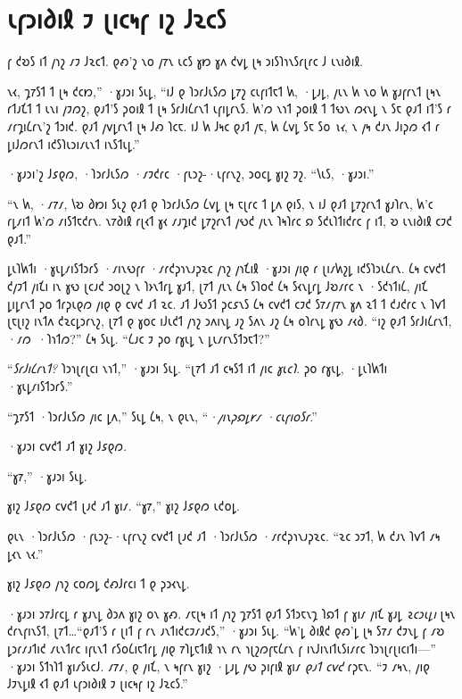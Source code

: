 \chapter{𐑧𐑝𐑮𐑦𐑔𐑦𐑙 𐑲 𐑚𐑦𐑤𐑰𐑝 𐑦𐑟 𐑓𐑷𐑤𐑕}

\begin{chapterOpeningQuote}
𐑝 𐑒𐑹𐑕 𐑦𐑑 𐑢𐑪𐑟 𐑥𐑲 𐑓𐑷𐑤𐑑. 𐑞𐑺'𐑟 𐑯𐑴 𐑢𐑳𐑯 𐑧𐑤𐑕 𐑣𐑽 𐑣𐑵 𐑒𐑫𐑛 𐑚𐑰 𐑮𐑦𐑕𐑐𐑪𐑯𐑕𐑩𐑚𐑩𐑤 𐑓 𐑧𐑯𐑦𐑔𐑦𐑙.
\end{chapterOpeningQuote}

\lettrine[ante=“]{𐑯}{𐑬}, 𐑡𐑳𐑕𐑑 𐑑 𐑚𐑰 𐑒𐑤𐑽,” ·𐑣𐑨𐑮𐑦 𐑕𐑧𐑛, “𐑦𐑓 𐑞 𐑐𐑮𐑩𐑓𐑧𐑕𐑼 𐑛𐑳𐑟 𐑤𐑧𐑝𐑦𐑑𐑱𐑑 𐑿, ·𐑛𐑨𐑛, 𐑢𐑧𐑯 𐑿 𐑯𐑴 𐑿 𐑣𐑨𐑝𐑩𐑯𐑑 𐑚𐑰𐑯 𐑩𐑑𐑨𐑗𐑑 𐑑 𐑧𐑯𐑦 𐑢𐑲𐑼𐑟, 𐑞𐑨𐑑'𐑕 𐑜𐑴𐑦𐑙 𐑑 𐑚𐑰 𐑕𐑩𐑓𐑦𐑖𐑩𐑯𐑑 𐑧𐑝𐑦𐑛𐑩𐑯𐑕. 𐑿'𐑼 𐑯𐑪𐑑 𐑜𐑴𐑦𐑙 𐑑 𐑑𐑻𐑯 𐑼𐑬𐑯𐑛 𐑯 𐑕𐑱 𐑞𐑨𐑑 𐑦𐑑'𐑕 𐑩 𐑥𐑩𐑡𐑦𐑖𐑩𐑯'𐑟 𐑑𐑮𐑦𐑒. 𐑞𐑨𐑑 𐑢𐑫𐑛𐑩𐑯𐑑 𐑚𐑰 𐑓𐑺 𐑐𐑤𐑱. 𐑦𐑓 𐑿 𐑓𐑰𐑤 𐑞𐑨𐑑 𐑢𐑱, 𐑿 𐑖𐑫𐑛 𐑕𐑱 𐑕𐑴 \emph{𐑯𐑬}, 𐑯 𐑢𐑰 𐑒𐑨𐑯 𐑓𐑦𐑜𐑼 𐑬𐑑 𐑩 𐑛𐑦𐑓𐑼𐑩𐑯𐑑 𐑦𐑒𐑕𐑐𐑧𐑮𐑦𐑥𐑧𐑯𐑑 𐑦𐑯𐑕𐑑𐑧𐑛.”

·𐑣𐑨𐑮𐑦'𐑟 𐑓𐑭𐑞𐑼, ·𐑐𐑮𐑩𐑓𐑧𐑕𐑼 ·𐑥𐑲𐑒𐑩𐑤 ·𐑝𐑧𐑮𐑟-·𐑧𐑝𐑩𐑯𐑟, 𐑮𐑴𐑤𐑛 𐑣𐑦𐑟 𐑲𐑟. “𐑘𐑧𐑕, ·𐑣𐑨𐑮𐑦.”

“𐑯 𐑿, ·𐑥𐑳𐑥, 𐑘𐑹 𐑔𐑽𐑦 𐑕𐑧𐑟 𐑞𐑨𐑑 𐑞 𐑐𐑮𐑩𐑓𐑧𐑕𐑼 𐑖𐑫𐑛 𐑚𐑰 𐑱𐑚𐑩𐑤 𐑑 𐑛𐑵 𐑞𐑦𐑕, 𐑯 𐑦𐑓 𐑞𐑨𐑑 𐑛𐑳𐑟𐑩𐑯𐑑 𐑣𐑨𐑐𐑩𐑯, 𐑿'𐑤 𐑩𐑛𐑥𐑦𐑑 𐑿'𐑼 𐑥𐑦𐑕𐑑𐑱𐑒𐑩𐑯. 𐑯𐑳𐑔𐑦𐑙 𐑩𐑚𐑬𐑑 𐑣𐑬 𐑥𐑨𐑡𐑦𐑒 𐑛𐑳𐑟𐑩𐑯𐑑 𐑢𐑻𐑒 𐑢𐑧𐑯 𐑐𐑰𐑐𐑩𐑤 𐑸 𐑕𐑒𐑧𐑐𐑑𐑦𐑒𐑩𐑤 𐑝 𐑦𐑑, 𐑹 𐑧𐑯𐑦𐑔𐑦𐑙 𐑤𐑲𐑒 𐑞𐑨𐑑.”

𐑛𐑧𐑐𐑿𐑑𐑦 ·𐑣𐑧𐑛𐑥𐑦𐑕𐑑𐑮𐑩𐑕 ·𐑥𐑦𐑯𐑻𐑝𐑩 ·𐑥𐑩𐑒𐑜𐑪𐑯𐑨𐑜𐑷𐑤 𐑢𐑪𐑟 𐑢𐑪𐑗𐑦𐑙 ·𐑣𐑨𐑮𐑦 𐑢𐑦𐑞 𐑩 𐑚𐑦𐑥𐑿𐑟𐑛 𐑦𐑒𐑕𐑐𐑮𐑧𐑖𐑩𐑯. 𐑖𐑰 𐑤𐑫𐑒𐑑 𐑒𐑢𐑲𐑑 𐑢𐑦𐑗𐑦 𐑦𐑯 𐑣𐑻 𐑚𐑤𐑨𐑒 𐑮𐑴𐑚𐑟 𐑯 𐑐𐑶𐑯𐑑𐑩𐑛 𐑣𐑨𐑑, 𐑚𐑳𐑑 𐑢𐑧𐑯 𐑖𐑰 𐑕𐑐𐑴𐑒 𐑖𐑰 𐑕𐑬𐑯𐑛𐑩𐑛 𐑓𐑹𐑥𐑩𐑤 𐑯 ·𐑕𐑒𐑪𐑑𐑦𐑖, 𐑢𐑦𐑗 𐑛𐑦𐑛𐑩𐑯𐑑 𐑜𐑴 𐑑𐑩𐑜𐑧𐑞𐑼 𐑢𐑦𐑞 𐑞 𐑤𐑫𐑒 𐑨𐑑 𐑷𐑤. 𐑨𐑑 𐑓𐑻𐑕𐑑 𐑜𐑤𐑭𐑯𐑕 𐑖𐑰 𐑤𐑫𐑒𐑑 𐑤𐑲𐑒 𐑕𐑳𐑥𐑢𐑳𐑯 𐑣𐑵 𐑷𐑑 𐑑 𐑒𐑨𐑒𐑩𐑤 𐑯 𐑐𐑫𐑑 𐑚𐑱𐑚𐑦𐑟 𐑦𐑯𐑑𐑵 𐑒𐑷𐑤𐑛𐑮𐑩𐑯𐑟, 𐑚𐑳𐑑 𐑞 𐑣𐑴𐑤 𐑦𐑓𐑧𐑒𐑑 𐑢𐑪𐑟 𐑮𐑵𐑦𐑯𐑛 𐑨𐑟 𐑕𐑵𐑯 𐑨𐑟 𐑖𐑰 𐑴𐑐𐑩𐑯𐑛 𐑣𐑻 𐑥𐑬𐑔. “𐑦𐑟 𐑞𐑨𐑑 𐑕𐑩𐑓𐑦𐑖𐑩𐑯𐑑, ·𐑥𐑼~·𐑐𐑪𐑑𐑼?” 𐑖𐑰 𐑕𐑧𐑛. “𐑖𐑨𐑤 𐑲 𐑜𐑴 𐑩𐑣𐑧𐑛 𐑯 𐑛𐑧𐑥𐑩𐑯𐑕𐑑𐑮𐑱𐑑?”

“\emph{𐑕𐑩𐑓𐑦𐑖𐑩𐑯𐑑?} 𐑐𐑮𐑪𐑚𐑩𐑚𐑤𐑦 𐑯𐑪𐑑,” ·𐑣𐑨𐑮𐑦 𐑕𐑧𐑛. “𐑚𐑳𐑑 𐑨𐑑 𐑤𐑰𐑕𐑑 𐑦𐑑 𐑢𐑦𐑤 \emph{𐑣𐑧𐑤𐑐}. 𐑜𐑴 𐑩𐑣𐑧𐑛, ·𐑛𐑧𐑐𐑿𐑑𐑦 ·𐑣𐑧𐑛𐑥𐑦𐑕𐑑𐑮𐑩𐑕.”

“𐑡𐑳𐑕𐑑 ·𐑐𐑮𐑩𐑓𐑧𐑕𐑼 𐑢𐑦𐑤 𐑛𐑵,” 𐑕𐑧𐑛 𐑖𐑰, 𐑯 𐑞𐑧𐑯, “\emph{·𐑢𐑦𐑯𐑜𐑸𐑛𐑾𐑥 ·𐑤𐑧𐑝𐑦𐑴𐑕𐑩}.”

·𐑣𐑨𐑮𐑦 𐑤𐑫𐑒𐑑 𐑨𐑑 𐑣𐑦𐑟 𐑓𐑭𐑞𐑼.

“𐑣𐑳,” ·𐑣𐑨𐑮𐑦 𐑕𐑧𐑛.

𐑣𐑦𐑟 𐑓𐑭𐑞𐑼 𐑤𐑫𐑒𐑑 𐑚𐑨𐑒 𐑨𐑑 𐑣𐑦𐑥. “𐑣𐑳,” 𐑣𐑦𐑟 𐑓𐑭𐑞𐑼 𐑧𐑒𐑴𐑛.

𐑞𐑧𐑯 ·𐑐𐑮𐑩𐑓𐑧𐑕𐑼 ·𐑝𐑧𐑮𐑟-·𐑧𐑝𐑩𐑯𐑟 𐑤𐑫𐑒𐑑 𐑚𐑨𐑒 𐑨𐑑 ·𐑐𐑮𐑩𐑓𐑧𐑕𐑼 ·𐑥𐑩𐑒𐑜𐑪𐑯𐑨𐑜𐑷𐑤. “𐑷𐑤 𐑮𐑲𐑑, 𐑿 𐑒𐑨𐑯 𐑐𐑫𐑑 𐑥𐑰 𐑛𐑬𐑯 𐑯𐑬.”

𐑣𐑦𐑟 𐑓𐑭𐑞𐑼 𐑢𐑪𐑟 𐑤𐑴𐑼𐑛 𐑒𐑺𐑓𐑩𐑤𐑦 𐑑 𐑞 𐑜𐑮𐑬𐑯𐑛.

·𐑣𐑨𐑮𐑦 𐑮𐑳𐑓𐑩𐑤𐑛 𐑩 𐑣𐑨𐑯𐑛 𐑔𐑮𐑵 𐑣𐑦𐑟 𐑴𐑯 𐑣𐑺. 𐑥𐑱𐑚𐑰 𐑦𐑑 𐑢𐑪𐑟 𐑡𐑳𐑕𐑑 𐑞𐑨𐑑 𐑕𐑑𐑮𐑱𐑯𐑡 𐑐𐑸𐑑 𐑝 𐑣𐑦𐑥 𐑢𐑦𐑗 𐑣𐑨𐑛 \emph{𐑷𐑤𐑮𐑧𐑛𐑦} 𐑚𐑰𐑯 𐑒𐑩𐑯𐑝𐑦𐑯𐑕𐑑, 𐑚𐑳𐑑…“𐑞𐑨𐑑'𐑕 𐑩 𐑚𐑦𐑑 𐑝 𐑩𐑯 𐑨𐑯𐑑𐑦𐑒𐑤𐑲𐑥𐑨𐑒𐑕,” ·𐑣𐑨𐑮𐑦 𐑕𐑧𐑛. “𐑿'𐑛 𐑔𐑦𐑙𐑒 𐑞𐑺'𐑛 𐑚𐑰 𐑕𐑳𐑥 𐑒𐑲𐑯𐑛 𐑝 𐑥𐑹 𐑛𐑮𐑩𐑥𐑨𐑑𐑦𐑒 𐑥𐑧𐑯𐑑𐑩𐑤 𐑦𐑝𐑧𐑯𐑑 𐑩𐑕𐑴𐑖𐑦𐑱𐑑𐑩𐑛 𐑢𐑦𐑞 𐑳𐑐𐑛𐑱𐑑𐑦𐑙 𐑪𐑯 𐑩𐑯 𐑪𐑚𐑟𐑼𐑝𐑱𐑖𐑩𐑯 𐑝 𐑦𐑯𐑓𐑦𐑯𐑦𐑑𐑧𐑕𐑦𐑥𐑩𐑤 𐑐𐑮𐑪𐑚𐑩𐑚𐑦𐑤𐑦𐑑𐑦—” ·𐑣𐑨𐑮𐑦 𐑕𐑑𐑪𐑐𐑑 𐑣𐑦𐑥𐑕𐑧𐑤𐑓. 𐑥𐑳𐑥, 𐑞 𐑢𐑦𐑗, 𐑯 𐑰𐑝𐑩𐑯 𐑣𐑦𐑟 ·𐑛𐑨𐑛 𐑢𐑻 𐑜𐑦𐑝𐑦𐑙 𐑣𐑦𐑥 \emph{𐑞𐑨𐑑 𐑤𐑫𐑒} 𐑩𐑜𐑱𐑯. “𐑲 𐑥𐑰𐑯, 𐑢𐑦𐑞 𐑓𐑲𐑯𐑛𐑦𐑙 𐑬𐑑 𐑞𐑨𐑑 𐑧𐑝𐑮𐑦𐑔𐑦𐑙 𐑲 𐑚𐑦𐑤𐑰𐑝 𐑦𐑟 𐑓𐑷𐑤𐑕.”

